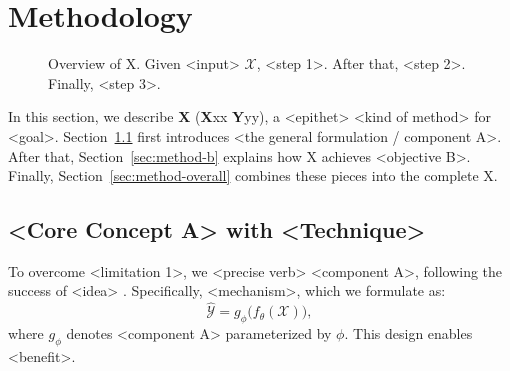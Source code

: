 \section{Methodology} \label{sec:methodology}
\begin{figure}[t]
    \centering
    \vspace{-8pt}
    \caption{Overview of X. Given <input> $\mathcal{X}$, <step 1>. After that, <step 2>. Finally, <step 3>.}
    \label{fig:main-figure}
    \vspace{-12pt}
\end{figure}
In this section, we describe \textbf{X} (\textbf{X}xx \textbf{Y}yy), a <epithet> <kind of method> for <goal>.
Section~\ref{sec:method-a} first introduces <the general formulation / component A>.
After that, Section~\ref{sec:method-b} explains how X achieves <objective B>.
Finally, Section~\ref{sec:method-overall} combines these pieces into the complete X.

\subsection{<Core Concept A> with <Technique>} \label{sec:method-a}
To overcome <limitation 1>, we <precise verb> <component A>, following the success of <idea> \citep{Placeholder-C}.
Specifically, <mechanism>, which we formulate as:
\begin{equation} \label{eq:component-a}
    \hat{\mathcal{Y}} = g_{\phi}\big(f_\theta(\mathcal{X})\big),
\end{equation}
where $g_{\phi}$ denotes <component A> parameterized by $\phi$.
This design enables <benefit>.

